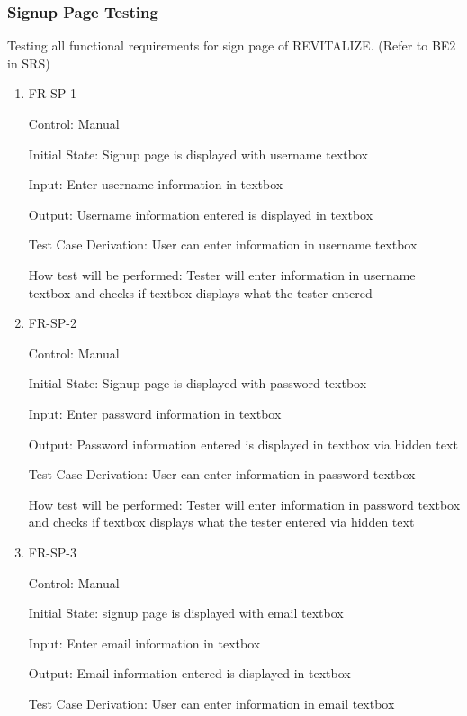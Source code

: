 \documentclass[12pt, titlepage]{article}
\begin{document}
\subsubsection{Signup Page Testing}

Testing all functional requirements for sign page of REVITALIZE. (Refer to BE2 in SRS)

\begin{enumerate}
	
	\item{FR-SP-1\\}
	
	Control: Manual
	
	Initial State: Signup page is displayed with username textbox
	
	Input: Enter username information in textbox
	
	Output: Username information entered is displayed in textbox
	
	Test Case Derivation: User can enter information in username textbox
	
	How test will be performed: Tester will enter information in username textbox and checks if textbox displays what the tester entered
	
	\item{FR-SP-2 \\}
	
	Control: Manual
	
	Initial State: Signup page is displayed with password textbox
	
	Input: Enter password information in textbox
	
	Output: Password information entered is displayed in textbox via hidden text
	
	Test Case Derivation: User can enter information in password textbox
	
	How test will be performed: Tester will enter information in password textbox and checks if textbox displays what the tester entered via hidden text
	
	\item{FR-SP-3\\}
	
	Control: Manual
	
	Initial State: signup page is displayed with email textbox
	
	Input: Enter email information in textbox
	
	Output: Email information entered is displayed in textbox
	
	Test Case Derivation: User can enter information in email textbox
	

\end{enumerate}
\end{document}
